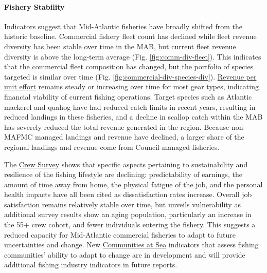 \documentclass[
  10pt,
]{article}
\begin{document}
\paragraph{Fishery Stability}\label{fishery-stability}

Indicators suggest that Mid-Atlantic fisheries have broadly shifted from the historic baseline. Commercial fishery fleet count has declined while fleet revenue diversity has been stable over time in the MAB, but current fleet revenue diversity is above the long-term average (Fig. \ref{fig:comm-div-fleet}). This indicates that the commercial fleet composition has changed, but the portfolio of species targeted is similar over time (Fig. \ref{fig:commercial-div-species-div}). \href{https://noaa-edab.github.io/catalog/effective_sweptarea.html}{Revenue per unit effort} remains steady or increasing over time for most gear types, indicating financial viability of current fishing operations. Target species such as Atlantic mackerel and quahog have had reduced catch limits in recent years, resulting in reduced landings in these fisheries, and a decline in scallop catch within the MAB has severely reduced the total revenue generated in the region. Because non-MAFMC managed landings and revenue have declined, a larger share of the regional landings and revenue come from Council-managed fisheries.

The \href{https://noaa-edab.github.io/catalog/crew_survey.html}{Crew Survey} shows that specific aspects pertaining to sustainability and resilience of the fishing lifestyle are declining: predictability of earnings, the amount of time away from home, the physical fatigue of the job, and the personal health impacts have all been cited as dissatisfaction rates increase. Overall job satisfaction remains relatively stable over time, but unveils vulnerability as additional survey results show an aging population, particularly an increase in the 55+ crew cohort, and fewer individuals entering the fishery. This suggests a reduced capacity for Mid-Atlantic commercial fisheries to adapt to future uncertainties and change. New \href{https://noaa-edab.github.io/catalog/communities_at_sea.html}{Communities at Sea} indicators that assess fishing communities' ability to adapt to change are in development and will provide additional fishing industry indicators in future reports.
\end{document}
